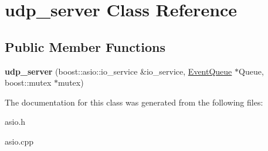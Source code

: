 \hypertarget{classudp__server}{\section{udp\-\_\-server Class Reference}
\label{classudp__server}
}
\subsection*{Public Member Functions}
\begin{DoxyCompactItemize}
\item 
\hypertarget{classudp__server_a02cdf77fb35a70b1ab817805a76d22e7}{{\bfseries udp\-\_\-server} (boost\-::asio\-::io\-\_\-service \&io\-\_\-service, \hyperlink{classpho_1_1EventQueue}{Event\-Queue} $\ast$Queue, boost\-::mutex $\ast$mutex)}\label{classudp__server_a02cdf77fb35a70b1ab817805a76d22e7}

\end{DoxyCompactItemize}


The documentation for this class was generated from the following files\-:\begin{DoxyCompactItemize}
\item 
asio.\-h\item 
asio.\-cpp\end{DoxyCompactItemize}
